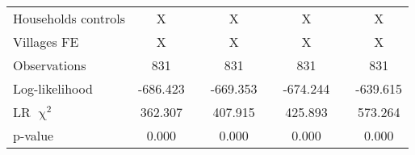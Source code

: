\begin{table}[htbp]
{\begin{tabular}{lcccccccccccc}
    Households controls & X     &       & \multicolumn{2}{c}{X} &       & \multicolumn{2}{c}{X} &       & \multicolumn{4}{c}{X} \\
    Villages FE & X     &       & \multicolumn{2}{c}{X} &       & \multicolumn{2}{c}{X} &       & \multicolumn{4}{c}{X} \\
    \midrule
    Observations & 831   &       & \multicolumn{2}{c}{831} &       & \multicolumn{2}{c}{831} &       & \multicolumn{4}{c}{831} \\
    Log-likelihood & -686.423 &       & \multicolumn{2}{c}{-669.353} &       & \multicolumn{2}{c}{-674.244} &       & \multicolumn{4}{c}{-639.615} \\
    LR $\upchi^2$ & 362.307 &       & \multicolumn{2}{c}{407.915} &       & \multicolumn{2}{c}{425.893} &       & \multicolumn{4}{c}{573.264} \\
    p-value & 0.000 &       & \multicolumn{2}{c}{0.000} &       & \multicolumn{2}{c}{0.000} &       & \multicolumn{4}{c}{0.000} \\
    \bottomrule

    \end{tabular}%
    }
  \label{tab:ame_debtpath}%
\end{table}%

